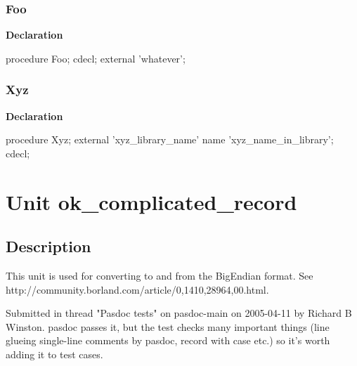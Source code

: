 \documentclass{report}
\begin{document}
\subsection*{Foo}
\begin{list}{}{
\setlength{\itemindent}{0cm}
\setlength{\listparindent}{0cm}
\setlength{\leftmargin}{\evensidemargin}
\addtolength{\leftmargin}{\tmplength}
\settowidth{\labelsep}{X}
\addtolength{\leftmargin}{\labelsep}
\setlength{\labelwidth}{\tmplength}
}
\begin{flushleft}
\item[\textbf{Declaration}\hfill]
\begin{ttfamily}
procedure Foo; cdecl; external 'whatever';\end{ttfamily}


\end{flushleft}
\end{list}
\subsection*{Xyz}
\begin{list}{}{
\setlength{\itemindent}{0cm}
\setlength{\listparindent}{0cm}
\setlength{\leftmargin}{\evensidemargin}
\addtolength{\leftmargin}{\tmplength}
\settowidth{\labelsep}{X}
\addtolength{\leftmargin}{\labelsep}
\setlength{\labelwidth}{\tmplength}
}
\begin{flushleft}
\item[\textbf{Declaration}\hfill]
\begin{ttfamily}
procedure Xyz; external 'xyz{\_}library{\_}name' name 'xyz{\_}name{\_}in{\_}library'; cdecl;\end{ttfamily}


\end{flushleft}
\end{list}
\chapter{Unit ok{\_}complicated{\_}record}
\section{Description}
 This unit is used for converting to and from the BigEndian format. See http://community.borland.com/article/0,1410,28964,00.html.\hfill\vspace*{1ex}

Submitted in thread "Pasdoc tests" on pasdoc{-}main on 2005{-}04{-}11 by Richard B Winston. pasdoc passes it, but the test checks many important things (line glueing single{-}line comments by pasdoc, record with case etc.) so it's worth adding it to test cases.
\end{document}
